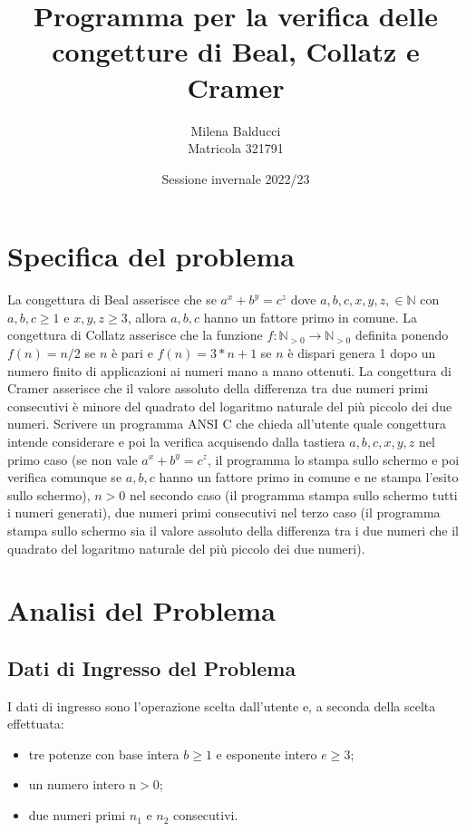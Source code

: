 \documentclass{article}
\title{Programma per la verifica delle congetture di Beal, Collatz e Cramer}
\date{Sessione invernale 2022/23}
\author{Milena Balducci \\ Matricola 321791}
\begin{document}
\maketitle

\newpage

\section{Specifica del problema}
La congettura di Beal asserisce che se $a^x + b^y = c^z$ dove $a,b,c,x,y,z, \in \mathbb{N}$ con $a,b,c\ge1$ e $x,y,z\ge3$, allora $a,b,c$ hanno un fattore primo in comune. 
La congettura di Collatz asserisce che la funzione $f:\mathbb{N}_{>0}\longrightarrow\mathbb{N}_{>0}$ definita ponendo $f(n) = n/2$ se $n$ è pari e $f(n) = 3 * n + 1$ 
se $n$ è dispari genera 1 dopo un numero finito di applicazioni ai numeri mano a mano ottenuti. 
La congettura di Cramer asserisce che il valore assoluto della differenza tra due numeri primi consecutivi è minore del quadrato del logaritmo naturale del più piccolo dei due numeri. 
Scrivere un programma ANSI C che chieda all'utente quale congettura intende considerare e poi la verifica acquisendo dalla tastiera $a,b,c,x,y,z$ nel primo caso 
(se non vale  $a^x + b^y = c^z$, il programma lo stampa sullo schermo e poi verifica comunque se $a,b,c$ hanno un fattore primo in comune e ne stampa l'esito 
sullo schermo), $n>0$ nel secondo caso (il programma stampa sullo schermo tutti i numeri generati), 
due numeri primi consecutivi nel terzo caso (il programma stampa sullo schermo sia il valore assoluto della differenza tra i due numeri che il quadrato del 
logaritmo naturale del più piccolo dei due numeri). 

\newpage

\section{Analisi del Problema}
\subsection{Dati di Ingresso del Problema}
I dati di ingresso sono l'operazione scelta dall'utente e, a seconda della scelta effettuata:

\begin{itemize}
\item tre potenze con base intera $b\ge1$ e esponente intero $e\ge3$;
\item un numero intero n$>0$;
\item due numeri primi $n_1$ e $n_2$ consecutivi.
\end{itemize}
\end{document}
